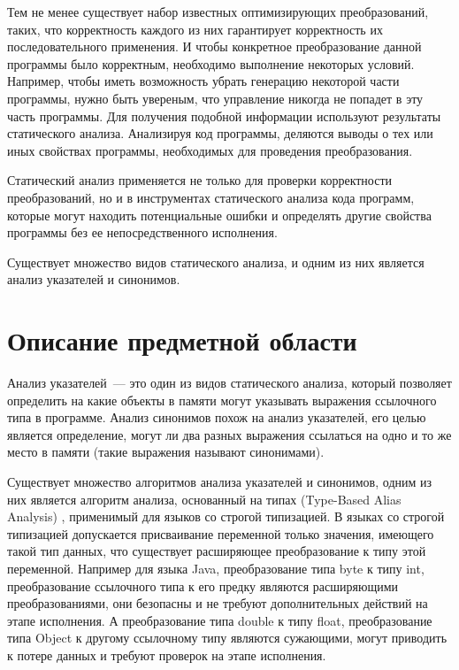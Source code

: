 \documentclass[14pt,titlepage]{extarticle}
\newcommand{\eng}[1]{{\English#1}}
\begin{document}
    Тем не менее существует набор известных оптимизирующих преобразований,
    таких, что корректность каждого из них гарантирует корректность их
    последовательного применения.
    И чтобы конкретное преобразование данной программы было корректным,
    необходимо выполнение некоторых условий. Например, чтобы иметь
    возможность убрать генерацию некоторой части программы, нужно быть
    увереным, что управление никогда не попадет в эту часть программы.
    Для получения подобной информации используют результаты статического
    анализа. Анализируя код программы, деляются выводы о тех или иных свойствах
    программы, необходимых для проведения преобразования.

    Статический анализ применяется не только для проверки
    корректности преобразований, но и в инструментах статического анализа
    кода программ, которые могут находить потенциальные ошибки и определять
    другие свойства программы без ее непосредственного исполнения.

    Существует множество видов статического анализа, и одним из них
    является анализ указателей и синонимов.

  \newpage
  \section{Описание предметной области}

    Анализ указателей~--- это один из видов статического анализа, который
    позволяет определить на какие объекты в памяти могут указывать выражения
    ссылочного типа в программе. Анализ синонимов похож на анализ указателей,
    его целью является определение, могут ли два разных выражения ссылаться
    на одно и то же место в памяти (такие выражения называют синонимами).

    Существует множество алгоритмов анализа указателей и синонимов,
    одним из них является алгоритм анализа, основанный на типах
    (\eng{Type-Based Alias Analysis}) \cite{diwan_tbaa},
    применимый для языков со строгой типизацией.
    В языках со строгой типизацией допускается присваивание переменной только
    значения, имеющего такой тип данных, что существует расширяющее
    преобразование к типу этой переменной.
    Например для языка Java, преобразование типа byte к типу int,
    преобразование ссылочного типа к его предку являются расширяющими
    преобразованиями, они безопасны и не требуют дополнительных действий
    на этапе исполнения.
    А преобразование типа double к типу float, преобразование типа
    Object к другому ссылочному типу являются сужающими, могут приводить к
    потере данных и требуют проверок на этапе исполнения.
\end{document}
